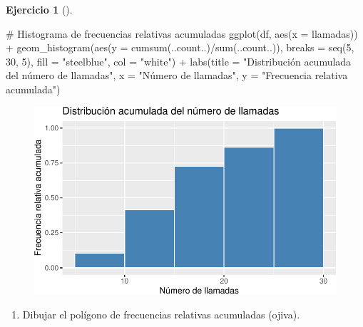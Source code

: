 \documentclass[
  a4paper,
]{scrreport}
\newenvironment{Shaded}{\begin{snugshade}}{\end{snugshade}}
\newcommand{\AttributeTok}[1]{\textcolor[rgb]{0.40,0.45,0.13}{#1}}
\newcommand{\CommentTok}[1]{\textcolor[rgb]{0.37,0.37,0.37}{#1}}
\newcommand{\DecValTok}[1]{\textcolor[rgb]{0.68,0.00,0.00}{#1}}
\newcommand{\FunctionTok}[1]{\textcolor[rgb]{0.28,0.35,0.67}{#1}}
\newcommand{\NormalTok}[1]{\textcolor[rgb]{0.00,0.23,0.31}{#1}}
\newcommand{\SpecialCharTok}[1]{\textcolor[rgb]{0.37,0.37,0.37}{#1}}
\newcommand{\StringTok}[1]{\textcolor[rgb]{0.13,0.47,0.30}{#1}}
\providecommand{\tightlist}{%
  \setlength{\itemsep}{0pt}\setlength{\parskip}{0pt}}\usepackage{longtable,booktabs,array}
\theoremstyle{definition}
\newtheorem{exercise}{Ejercicio}[chapter]
\theoremstyle{remark}
\begin{document}
\begin{exercise}[]
\begin{tcolorbox}
\begin{Shaded}
\begin{Highlighting}[]
\CommentTok{\# Histograma de frecuencias relativas acumuladas}
\FunctionTok{ggplot}\NormalTok{(df, }\FunctionTok{aes}\NormalTok{(}\AttributeTok{x =}\NormalTok{ llamadas)) }\SpecialCharTok{+}
    \FunctionTok{geom\_histogram}\NormalTok{(}\FunctionTok{aes}\NormalTok{(}\AttributeTok{y =} \FunctionTok{cumsum}\NormalTok{(..count..)}\SpecialCharTok{/}\FunctionTok{sum}\NormalTok{(..count..)),  }\AttributeTok{breaks =} \FunctionTok{seq}\NormalTok{(}\DecValTok{5}\NormalTok{, }\DecValTok{30}\NormalTok{, }\DecValTok{5}\NormalTok{), }\AttributeTok{fill =} \StringTok{"steelblue"}\NormalTok{, }\AttributeTok{col =} \StringTok{"white"}\NormalTok{) }\SpecialCharTok{+}
    \FunctionTok{labs}\NormalTok{(}\AttributeTok{title =} \StringTok{"Distribución acumulada del número de llamadas"}\NormalTok{, }\AttributeTok{x =} \StringTok{"Número de llamadas"}\NormalTok{, }\AttributeTok{y =} \StringTok{"Frecuencia relativa acumulada"}\NormalTok{)}
\end{Highlighting}
\end{Shaded}

\begin{figure}[H]

{\centering \includegraphics{./03-frecuencias-graficos_files/figure-pdf/unnamed-chunk-19-4.pdf}

}

\end{figure}

\end{tcolorbox}

\begin{enumerate}
\def\labelenumi{\alph{enumi}.}
\setcounter{enumi}{4}
\tightlist
\item
  Dibujar el polígono de frecuencias relativas acumuladas (ojiva).
\end{enumerate}


\end{exercise}
\end{document}
